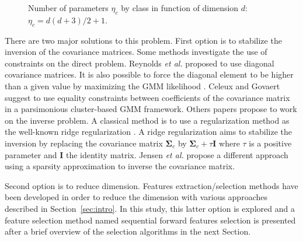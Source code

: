 \documentclass[journal]{IEEEtran}
\begin{document}
    \begin{figure}[!t]
        \centering
        \caption{Number of parameters $\eta_c$ by class in function of dimension $d$: $\eta_c=d(d+3)/2+1$.\label{fig:nb-param}}
    \end{figure}

    There are two major solutions to this problem. First option is to stabilize the inversion of the covariance matrices. Some methods investigate the use of constraints on the direct problem. Reynolds \emph{et al.} \cite{reynolds1995robust} proposed to use diagonal covariance matrices. It is also possible to force the diagonal element to be higher than a given value by maximizing the GMM likelihood \cite{hathaway1985constrained}. Celeux and Govaert \cite{celeux1995gaussian} suggest to use equality constraints between coefficients of the covariance matrix in a parsimonious cluster-based GMM framework. Others papers propose to work on the inverse problem. A classical method is to use a regularization method as the well-known ridge regularization \cite{hoerl1970ridge}. A ridge regularization aims to stabilize the inversion by replacing the covariance matrix $\boldsymbol{\Sigma}_c$ by $\boldsymbol{\Sigma}_c + \tau \mathbf{I}$ where $\tau$ is a positive parameter and $\mathbf{I}$ the identity matrix. Jensen \emph{et al.} \cite{jensen2008regression} propose a different approach using a sparsity approximation to inverse the covariance matrix.

    Second option is to reduce dimension. Features extraction/selection methods have been developed in order to reduce the dimension with various approaches described in Section~\ref{sec:intro}. In this study, this latter option is explored and a feature selection method named sequential forward features selection is presented after a brief overview of the selection algorithms in the next Section.
\end{document}
